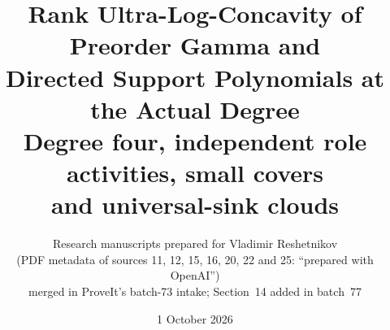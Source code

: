 \documentclass[11pt]{article}
\numberwithin{equation}{section}
\theoremstyle{definition}\newtheorem{definition}[theorem]{Definition}\newtheorem{remark}[theorem]{Remark}
\begin{document}
\hypersetup{pageanchor=false}
\title{Rank Ultra-Log-Concavity of Preorder Gamma and\\ Directed Support Polynomials at the Actual Degree\\[4pt]
\large Degree four, independent role activities, small covers\\ and universal-sink clouds}
\author{Research manuscripts prepared for Vladimir Reshetnikov\\
(PDF metadata of sources 11, 12, 15, 16, 20, 22 and 25: ``prepared with OpenAI'')\\[2pt]
\small merged in ProveIt's batch-73 intake; Section~14 added in batch~77}
\date{1 October 2026}
\maketitle
\thispagestyle{empty}
\hypersetup{pageanchor=true}
\end{document}

